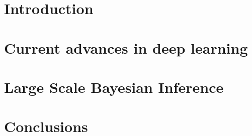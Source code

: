 \documentclass[a4paper, 11pt, openright, twoside]{reportPhD}
\numberwithin{equation}{section}
\numberwithin{figure}{chapter}
\numberwithin{table}{chapter}
\begin{document}
\chapter{Introduction}\label{cha:intro}

\setcounter{page}{1}



%

\chapter{Current advances in deep learning}\label{cha:deep}
%

\chapter{Large Scale Bayesian Inference}\label{cha:bayes}



%


%

%

\chapter{Conclusions}\label{cha:conclusions}

\end{document}
